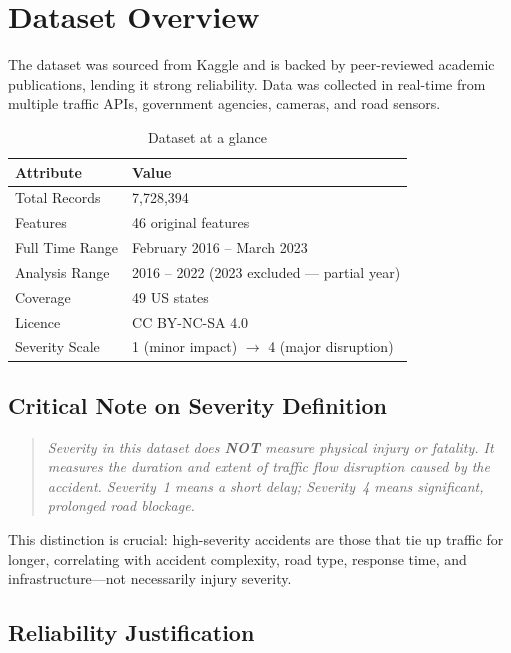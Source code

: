 
\section{Dataset Overview}

The dataset was sourced from Kaggle \cite{moosavi2019dataset} and is backed by
peer-reviewed academic publications, lending it strong reliability.
Data was collected in real-time from multiple traffic APIs, government agencies,
cameras, and road sensors.

\begin{table}[H]
\centering
\begin{tabular}{@{} l l @{}}
  \toprule
  \textbf{Attribute}  & \textbf{Value} \\ \midrule
  Total Records       & 7,728,394 \\
  Features            & 46 original features \\
  Full Time Range     & February 2016 – March 2023 \\
  Analysis Range      & 2016 – 2022 (2023 excluded — partial year) \\
  Coverage            & 49 US states \\
  Licence             & CC BY-NC-SA 4.0 \\
  Severity Scale      & 1 (minor impact) $\rightarrow$ 4 (major disruption) \\
  \bottomrule
\end{tabular}
\caption{Dataset at a glance}
\end{table}

\subsection*{Critical Note on Severity Definition}

\begin{quote}
  \itshape
  Severity in this dataset does \textbf{NOT} measure physical injury or
  fatality. It measures the duration and extent of traffic flow disruption
  caused by the accident. Severity~1 means a short delay; Severity~4 means
  significant, prolonged road blockage.
\end{quote}

This distinction is crucial: high-severity accidents are those that tie up
traffic for longer, correlating with accident complexity, road type, response
time, and infrastructure---not necessarily injury severity.

\subsection*{Reliability Justification}


